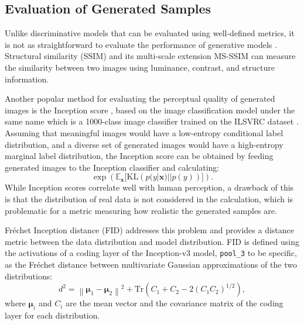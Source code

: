 \subsection{Evaluation of Generated Samples}

Unlike discriminative models that can be evaluated using well-defined metrics, it is not as straightforward to evaluate the performance of generative models \cite{theis2015evaluation}.
Structural similarity (SSIM) \cite{wang2004ssim} and its multi-scale extension MS-SSIM \cite{wang2003msssim} can measure the similarity between two images using luminance, contrast, and structure information.%

Another popular method for evaluating the perceptual quality of generated images is the Inception score \cite{salimans2016improved}, based on the image classification model under the same name \cite{szegedy2015inception} which is a 1000-class image classifier trained on the ILSVRC dataset \cite{russakovsky2015imagenet}.
Assuming that meaningful images would have a low-entropy conditional label distribution, and a diverse set of generated images would have a high-entropy marginal label distribution, the Inception score can be obtained by feeding generated images to the Inception classifier and calculating:
\begin{equation}\label{eqn:inception}
\exp \left ( \mathbb{E}_{\bm{x}} \Big[ \textrm{KL} \left ( p(y|\bm{x}) || p(y) \right ) \Big] \right ).
\end{equation}
While Inception scores correlate well with human perception, a drawback of this is that the distribution of real data is not considered in the calculation, which is problematic for a metric measuring how realistic the generated samples are.

Fréchet Inception distance (FID) \cite{heusel2017ttur} addresses this problem and provides a distance metric between the data distribution and model distribution.
FID is defined using the activations of a coding layer of the Inception-v3 model, \texttt{pool\_3} to be specific, as the Fréchet distance between multivariate Gaussian approximations of the two distributions:
\begin{equation}\label{eqn:fid}
d^2 = \left \lVert \bm{\mu}_1 - \bm{\mu}_2 \right \rVert^2 + \mathrm{Tr} \left ( C_1 + C_2 - 2 ( C_1 C_2 )^{1/2} \right ),
\end{equation}
where $\bm{\mu}_i$ and $C_i$ are the mean vector and the covariance matrix of the coding layer for each distribution.


